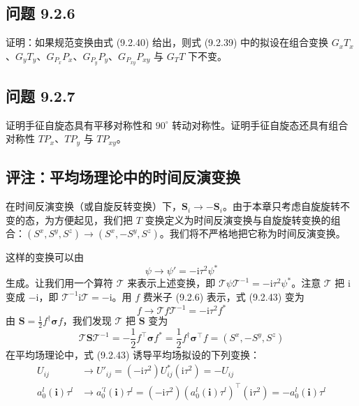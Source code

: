 \subsection*{问题 9.2.6}

证明：如果规范变换由式 (9.2.40) 给出，则式 (9.2.39) 中的拟设在组合变换 $G_xT_x$、$G_yT_y$、$G_{P_x}P_x$、$G_{P_y}P_y$、$G_{P_{xy}}P_{xy}$ 与 $G_TT$ 下不变。

\subsection*{问题 9.2.7}

证明手征自旋态具有平移对称性和 $90^{\circ}$ 转动对称性。证明手征自旋态还具有组合对称性 $TP_x$、$TP_y$ 与 $TP_{xy}$。

\subsection{评注：平均场理论中的时间反演变换}

在时间反演变换（或自旋反转变换）下，$\pmb{S}_i\to-\pmb{S}_i$。由于本章只考虑自旋旋转不变的态，为方便起见，我们把 $T$ 变换定义为时间反演变换与自旋旋转变换的组合：$(S^{x},S^{y},S^{z})\to(S^{x},-S^{y},S^{z})$。我们将不严格地把它称为时间反演变换。

这样的变换可以由
\begin{equation*}
\psi\to\psi'=-\mathrm{i}\tau^{2}\psi^{*}
\tag{9.2.43}
\end{equation*}
生成。让我们用一个算符 $\mathcal{T}$ 来表示上述变换，即 $\mathcal{T}\psi\mathcal{T}^{-1}=-\mathrm{i}\tau^{2}\psi^{*}$。注意 $\mathcal{T}$ 把 $\mathrm{i}$ 变成 $-\mathrm{i}$，即 $\mathcal{T}^{-1}\mathrm{i}\mathcal{T}=-\mathrm{i}$。用 $f$ 费米子 (9.2.6) 表示，式 (9.2.43) 变为
\begin{equation*}
f\to\mathcal{T}f\mathcal{T}^{-1}=-\mathrm{i}\tau^{2}f^{*}
\end{equation*}
由 $\pmb{S}=\frac{1}{2}f^{\dagger}\pmb{\sigma}f$，我们发现 $\mathcal{T}$ 把 $\pmb{S}$ 变为
\begin{equation*}
\mathcal{T}\pmb{S}\mathcal{T}^{-1}=-\frac{1}{2}f^{\top}\pmb{\sigma}f^{*}=\frac{1}{2}f^{\dagger}\pmb{\sigma}^{\top}f=(S^{x},-S^{y},S^{z})
\end{equation*}
在平均场理论中，式 (9.2.43) 诱导平均场拟设的下列变换：
\begin{equation*}
\begin{aligned}
U_{ij}&\to U'_{ij}=(-\mathrm{i}\tau^{2})U_{ij}^{*}(\mathrm{i}\tau^{2})=-U_{ij}\\
a_0^{l}(\pmb{i})\tau^{l}&\to a_0^{\prime l}(\pmb{i})\tau^{l}=(-\mathrm{i}\tau^{2})(a_0^{l}(\pmb{i})\tau^{l})^{\top}(\mathrm{i}\tau^{2})=-a_0^{l}(\pmb{i})\tau^{l}
\end{aligned}
\tag{9.2.44}
\end{equation*}

